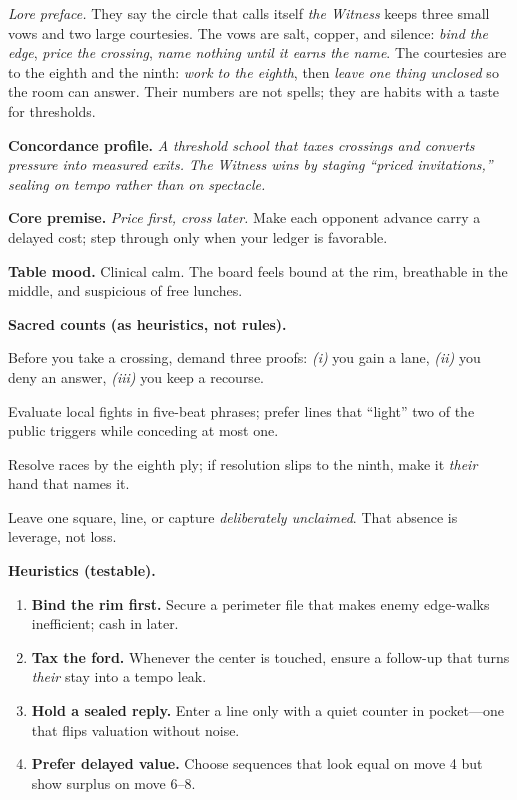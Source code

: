\documentclass[11pt]{article}
\begin{document}
\begin{itemize}
\noindent\textit{Lore preface.} They say the circle that calls itself \emph{the Witness} keeps three small vows and two large courtesies. The vows are salt, copper, and silence: \emph{bind the edge}, \emph{price the crossing}, \emph{name nothing until it earns the name}. The courtesies are to the eighth and the ninth: \emph{work to the eighth}, then \emph{leave one thing unclosed} so the room can answer. Their numbers are not spells; they are habits with a taste for thresholds.

\medskip
\noindent\textbf{Concordance profile.} \emph{A threshold school that taxes crossings and converts pressure into measured exits. The Witness wins by staging “priced invitations,” sealing on tempo rather than on spectacle.}

\medskip
\noindent\textbf{Core premise.} \textit{Price first, cross later.} Make each opponent advance carry a delayed cost; step through only when your ledger is favorable.

\medskip
\noindent\textbf{Table mood.} Clinical calm. The board feels bound at the rim, breathable in the middle, and suspicious of free lunches.

\medskip
\noindent\textbf{Sacred counts (as heuristics, not rules).}
\begin{description}\setlength\itemsep{0.35em}
  \item[\textbf{3} — Proof.] Before you take a crossing, demand three proofs: \emph{(i)} you gain a lane, \emph{(ii)} you deny an answer, \emph{(iii)} you keep a recourse.
  \item[\textbf{5} — Candles.] Evaluate local fights in five-beat phrases; prefer lines that “light” two of the public triggers while conceding at most one.
  \item[\textbf{8} — Work.] Resolve races by the eighth ply; if resolution slips to the ninth, make it \emph{their} hand that names it.
  \item[\textbf{9} — Remaining.] Leave one square, line, or capture \emph{deliberately unclaimed}. That absence is leverage, not loss.
\end{description}

\medskip
\noindent\textbf{Heuristics (testable).}
\begin{enumerate}\setlength\itemsep{0.25em}
  \item \textbf{Bind the rim first.} Secure a perimeter file that makes enemy edge-walks inefficient; cash in later.
  \item \textbf{Tax the ford.} Whenever the center is touched, ensure a follow-up that turns \emph{their} stay into a tempo leak.
  \item \textbf{Hold a sealed reply.} Enter a line only with a quiet counter in pocket—one that flips valuation without noise.
  \item \textbf{Prefer delayed value.} Choose sequences that look equal on move 4 but show surplus on move 6–8.
\end{enumerate}


\end{itemize}
\end{document}

